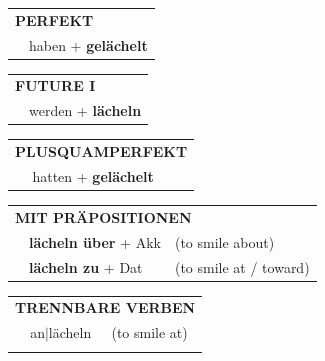 \documentclass[10pt,a4paper]{revtex4-2}
\begin{document}
\begin{verbbox}
\vspace{10pt}

\begin{tabular}{rl}
\multicolumn{2}{l}{\textbf{PERFEKT}}\\
& haben + \textbf{gelächelt}\\
\end{tabular}
\hfill
\begin{tabular}{rl}
\multicolumn{2}{l}{\textbf{FUTURE I}}\\
& werden + \textbf{lächeln}\\
\end{tabular}
\hfill
\begin{tabular}{rl}
\multicolumn{2}{l}{\textbf{PLUSQUAMPERFEKT}}\\
& hatten + \textbf{gelächelt}\\
\end{tabular}

\vspace{10pt}

\begin{tabular}{lll}
\multicolumn{3}{l}{\textbf{MIT PRÄPOSITIONEN}}\\
& \textbf{lächeln über} + Akk & (to smile about)\\
& \textbf{lächeln zu} + Dat & (to smile at / toward)\\
\end{tabular}
\hfill
\begin{tabular}{lll}
\multicolumn{3}{l}{\textbf{TRENNBARE VERBEN}}\\
& an$|$lächeln & (to smile at)\\
\vspace{10pt}
\end{tabular}

\vspace{-5pt}
\end{verbbox}
\end{document}
